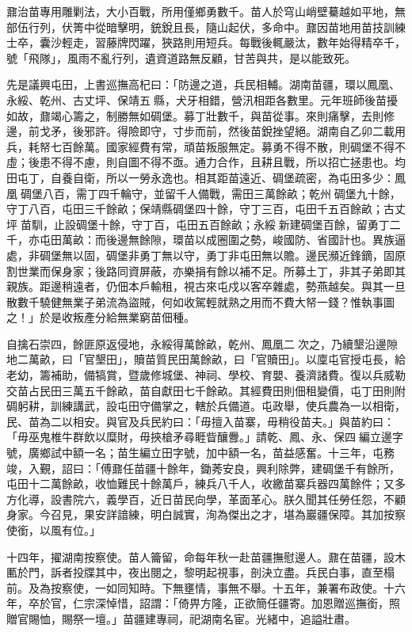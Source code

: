 \begin{pinyinscope}
鼐治苗專用雕剿法，大小百戰，所用僅鄉勇數千。苗人於穹山峭壁驀越如平地，無部伍行列，伏箐中從暗擊明，銃銳且長，隨山起伏，多命中。鼐因苗地用苗技訓練士卒，囊沙輕走，習藤牌閃躍，狹路則用短兵。每戰後輒嚴汰，數年始得精卒千，號「飛隊」，風雨不亂行列，遺資道路無反顧，甘苦與共，是以能致死。

先是議興屯田，上書巡撫高杞曰：「防邊之道，兵民相輔。湖南苗疆，環以鳳凰、永綏、乾州、古丈坪、保靖五縣，犬牙相錯，營汛相距各數里。元年班師後苗擾如故，鼐竭心籌之，制勝無如碉堡。募丁壯數千，與苗從事。來則痛擊，去則修邊，前戈矛，後邪許。得險即守，寸步而前，然後苗銳挫望絕。湖南自乙卯二載用兵，耗帑七百餘萬。國家經費有常，頑苗叛服無定。募勇不得不散，則碉堡不得不虛；後患不得不慮，則自圖不得不亟。通力合作，且耕且戰，所以招亡拯患也。均田屯丁，自養自衛，所以一勞永逸也。相其距苗遠近、碉堡疏密，為屯田多少：鳳凰碉堡八百，需丁四千輪守，並留千人備戰，需田三萬餘畝；乾州碉堡九十餘，守丁八百，屯田三千餘畝；保靖縣碉堡四十餘，守丁三百，屯田千五百餘畝；古丈坪苗馴，止設碉堡十餘，守丁百，屯田五百餘畝；永綏新建碉堡百餘，留勇丁二千，亦屯田萬畝：而後邊無餘隙，環苗以成圈圍之勢，峻國防、省國計也。異族逼處，非碉堡無以固，碉堡非勇丁無以守，勇丁非屯田無以贍。邊民瀕近鋒鏑，固原割世業而保身家；後路同資屏蔽，亦樂捐有餘以補不足。所募土丁，非其子弟即其親族。距邊稍遠者，仍佃本戶輸租，視古來屯戍以客卒雜處，勢燕越矣。與其一旦散數千驍健無業子弟流為盜賊，何如收駕輕就熟之用而不費大帑一錢？惟執事圖之！」於是收叛產分給無業窮苗佃種。

自擒石崇四，餘匪原返侵地，永綏得萬餘畝，乾州、鳳凰二次之，乃續墾沿邊隙地二萬畝，曰「官墾田」，贖苗質民田萬餘畝，曰「官贖田」。以廩屯官授屯長，給老幼，籌補助，備犒賞，暨歲修城堡、神祠、學校、育嬰、養濟諸費。復以兵威勒交苗占民田三萬五千餘畝，苗自獻田七千餘畝。其經費田則佃租變價，屯丁田則附碉躬耕，訓練講武，設屯田守備掌之，轄於兵備道。屯政舉，使兵農為一以相衛，民、苗為二以相安。與官及兵民約曰：「毋擅入苗寨，毋稍役苗夫。」與苗約曰：「毋巫鬼椎牛群飲以糜財，毋挾槍矛尋睚眥釀釁。」請乾、鳳、永、保四編立邊字號，廣鄉試中額一名；苗生編立田字號，加中額一名，苗益感奮。十三年，屯務竣，入覲，詔曰：「傅鼐任苗疆十餘年，鋤莠安良，興利除弊，建碉堡千有餘所，屯田十二萬餘畝，收恤難民十餘萬戶，練兵八千人，收繳苗寨兵器四萬餘件；又多方化導，設書院六，義學百，近日苗民向學，革面革心。朕久聞其任勞任怨，不顧身家。今召見，果安詳諳練，明白誠實，洵為傑出之才，堪為巖疆保障。其加按察使銜，以風有位。」

十四年，擢湖南按察使。苗人籥留，命每年秋一赴苗疆撫慰邊人。鼐在苗疆，設木匭於門，訴者投牒其中，夜出閱之，黎明起視事，剖決立盡。兵民白事，直至榻前。及為按察使，一如同知時。下無壅情，事無不舉。十五年，兼署布政使。十六年，卒於官，仁宗深悼惜，詔謂：「倚畀方隆，正欲簡任疆寄。加恩贈巡撫銜，照贈官賜恤，賜祭一壇。」苗疆建專祠，祀湖南名宦。光緒中，追謚壯肅。


\end{pinyinscope}
